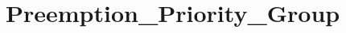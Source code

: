 \hypertarget{group___preemption___priority___group}{\section{Preemption\-\_\-\-Priority\-\_\-\-Group}
\label{group___preemption___priority___group}
}
